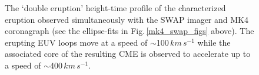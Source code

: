\documentclass[preprint2]{aastex}
\begin{document}
\begin{figure}[ht]
\caption{The `double eruption' height-time profile of the characterized eruption observed simultaneously with the SWAP imager and MK4 coronagraph (see the ellipse-fits in Fig.\,\ref{mk4_swap_figs} above). The erupting EUV loops move at a speed of $\sim$100$\,km\,s^{-1}$ while the associated core of the resulting CME is observed to accelerate up to a speed of $\sim$400$\,km\,s^{-1}$.}
\label{plot_heights_inner}
\end{figure}


\end{document}
